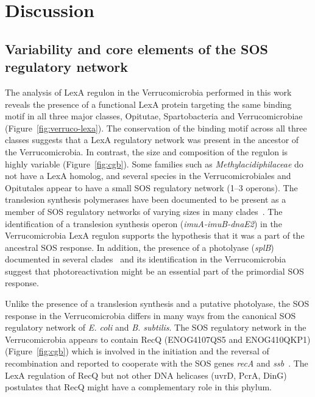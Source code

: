 \section{Discussion}

\subsection{Variability and core elements of the SOS regulatory network}
The analysis of LexA regulon in the Verrucomicrobia performed in this work
reveals the presence of a functional LexA protein targeting the same binding
motif in all three major classes, Opitutae, Spartobacteria and Verrucomicrobiae
(Figure~\ref{fig:verruco-lexa}). The conservation of the binding motif across
all three classes suggests that a LexA regulatory network was present in the
ancestor of the Verrucomicrobia. In contrast, the size and composition of the
regulon is highly variable (Figure~\ref{fig:cgb}). Some families such as
\textit{Methylacidiphilaceae} do not have a LexA homolog, and several species
in the Verrucomicrobiales and Opitutales appear to have a small SOS regulatory
network (1--3 operons). The translesion synthesis polymerases have been
documented to be present as a member of SOS regulatory networks of varying
sizes in many clades~\cite{erill2007aeons, davis2002definition,
  fernandez2000identification, sanchez2015sos, ulrich2013characterization,
  au2005genetic}. The identification of a translesion synthesis operon
(\textit{imuA-imuB-dnaE2}) in the Verrucomicrobia LexA regulon supports the
hypothesis that it was a part of the ancestral SOS response. In addition, the
presence of a photolyase (\textit{splB}) documented in several
clades~\cite{davis2002definition, cirz2006defining, sanchez2012analysis,
  ulrich2013characterization, sanchez2015sos} and its identification in the
Verrucomicrobia suggest that photoreactivation might be an essential part of
the primordial SOS response.

Unlike the presence of a translesion synthesis and a putative photolyase, the
SOS response in the Verrucomicrobia differs in many ways from the canonical SOS
regulatory network of \textit{E. coli} and \textit{B. subtilis}. The SOS
regulatory network in the Verrucomicrobia appears to contain RecQ (ENOG4107QS5
and ENOG410QKP1) (Figure~\ref{fig:cgb}) which is involved in the initiation and
the reversal of recombination and reported to cooperate with the SOS genes
\textit{recA} and \textit{ssb}~\cite{heyer2004damage,
  nakayama2005escherichia}. The LexA regulation of RecQ but not other DNA
helicases (uvrD, PcrA, DinG) postulates that RecQ might have a complementary
role in this phylum.

